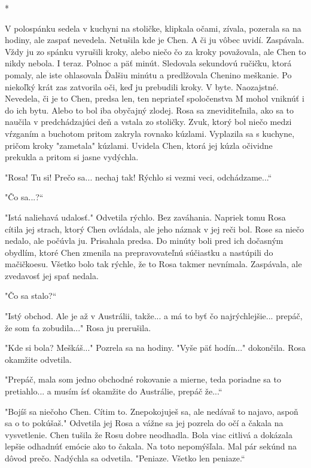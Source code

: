 \documentclass{book}
\begin{document}
\begin{center}

*

\end{center}

V polospánku sedela v kuchyni na stoličke, klipkala očami, zívala, pozerala sa na hodiny, ale zaspať nevedela. Netušila kde je Chen. A či ju vôbec uvidí. Zaspávala. Vždy ju zo spánku vyrušili kroky, alebo niečo čo za kroky považovala, ale Chen to nikdy nebola. I teraz. Polnoc a päť minút. Sledovala sekundovú ručičku, ktorá pomaly, ale iste ohlasovala Ďalšiu minútu a predlžovala Chenino meškanie. Po niekoľký krát zas zatvorila oči, keď ju prebudili kroky. V byte. Naozajstné. Nevedela, či je to Chen, predsa len, ten nepriateľ spoločenstva M mohol vniknúť i do ich bytu. Alebo to bol iba obyčajný zlodej. Rosa sa zneviditeľnila, ako sa to naučila v predchádzajúci deň a vstala zo stoličky. Zvuk, ktorý bol niečo medzi vŕzganím a buchotom pritom zakryla rovnako kúzlami. Vyplazila sa s kuchyne, pričom kroky "$ $zametala"$ $ kúzlami. Uvidela Chen, ktorá jej kúzla očividne prekukla a pritom si jasne vydýchla.

"$ $Rosa! Tu si! Prečo sa... nechaj tak! Rýchlo si vezmi veci, odchádzame...“

"$ $Čo sa...?“

"$ $Istá naliehavá udalosť."$ $ Odvetila rýchlo. Bez zaváhania. Napriek tomu Rosa cítila jej strach, ktorý Chen ovládala, ale jeho náznak v jej reči bol. Rose sa niečo nedalo, ale počúvla ju. Prisahala predsa. Do minúty boli pred ich dočasným obydlím, ktoré Chen zmenila na prepravovateľnú súčiastku a nastúpili do mačičkoesu. Všetko bolo tak rýchle, že to Rosa takmer nevnímala. Zaspávala, ale zvedavosť jej spať nedala.

"$ $Čo sa stalo?“

"$ $Istý obchod. Ale je až v Austrálii, takže... a má to byť čo najrýchlejšie... prepáč, že som ťa zobudila..."$ $ Rosa ju prerušila.

"$ $Kde si bola? Meškáš..."$ $ Pozrela sa na hodiny. "$ $Vyše päť hodín..."$ $ dokončila. Rosa okamžite odvetila.

"$ $Prepáč, mala som jedno obchodné rokovanie a mierne, teda poriadne sa to pretiahlo... a musím ísť okamžite do Austrálie, prepáč že...“

"$ $Bojíš sa niečoho Chen. Cítim to. Znepokojuješ sa, ale nedávaš to najavo, aspoň sa o to pokúšaš."$ $ Odvetila jej Rosa a vážne sa jej pozrela do očí a čakala na vysvetlenie. Chen tušila že Rosu dobre neodhadla. Bola viac citlivá a dokázala lepšie odhadnúť emócie ako to čakala. Na toto nepomýšľala. Mal pár sekúnd na dôvod prečo. Nadýchla sa odvetila. "$ $Peniaze. Všetko len peniaze.“
\end{document}
